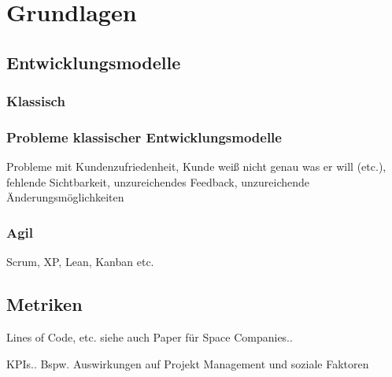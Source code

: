 \chapter{Grundlagen}

\section{Entwicklungsmodelle}

\subsection{Klassisch}

\subsection{Probleme klassischer Entwicklungsmodelle}

Probleme mit Kundenzufriedenheit, Kunde weiß nicht genau was er will (etc.),
fehlende Sichtbarkeit, unzureichendes Feedback, unzureichende Änderungsmöglichkeiten

\subsection{Agil}

Scrum, XP, Lean, Kanban etc.

\section{Metriken}

Lines of Code, etc.
siehe auch Paper für Space Companies..

KPIs..
Bspw. Auswirkungen auf Projekt Management und soziale Faktoren
